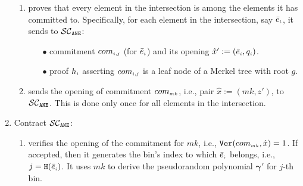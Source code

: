 \begin{enumerate}[leftmargin=5mm]
\begin{enumerate}[leftmargin=2.5mm]
\item \label{extractor-proves} proves that every element in the intersection is among the elements it has committed to. Specifically, for each element in the intersection, say $\bar{e}_{\scriptscriptstyle i}$, it sends to $\mathcal{SC}_{\mathtt{ANE}}$: 



\begin{enumerate}[leftmargin=3.5mm]
%
%
\item [$\bullet$]  commitment $com_{\scriptscriptstyle i,j}$ (for $\bar{e}_{\scriptscriptstyle i}$) and its  opening ${\hat x}':=(\bar{e}_{\scriptscriptstyle i},  q_{\scriptscriptstyle i})$. 


%
%

%
\item[$\bullet$]   proof $h_{\scriptscriptstyle i}$ asserting $com_{\scriptscriptstyle i,j}$ is a leaf node of   a Merkel tree with  root $g$. 

 \end{enumerate}
\item sends the opening of commitment $com_{\scriptscriptstyle mk}$, i.e., pair $\hat {x}:=(mk, z')$, to $\mathcal{SC}_{\mathtt{ANE}}$. This is done only once for all elements in the intersection.  

 \end{enumerate}
\item\label{e-psi::SC-verification} Contract $\mathcal{SC}_{\mathtt{ANE}}$:
%
\begin{enumerate}[leftmargin=2.4mm]

\item\label{e-psi::SC-verification--derive-mk}  verifies the opening of the commitment for $mk$, i.e., $\mathtt{Ver}(com_{\scriptscriptstyle mk},\hat{x})=1$. If accepted, then it generates the bin's index to which $ \bar{e}_{\scriptscriptstyle i}$ belongs, i.e., ${ {  {j}}}=\mathtt{H}(\bar {e}_{\scriptscriptstyle i})$. It  uses $mk$ to derive the pseudorandom polynomial $\bm\gamma'$ for $j$-th bin. 



\end{enumerate}
\end{enumerate}
